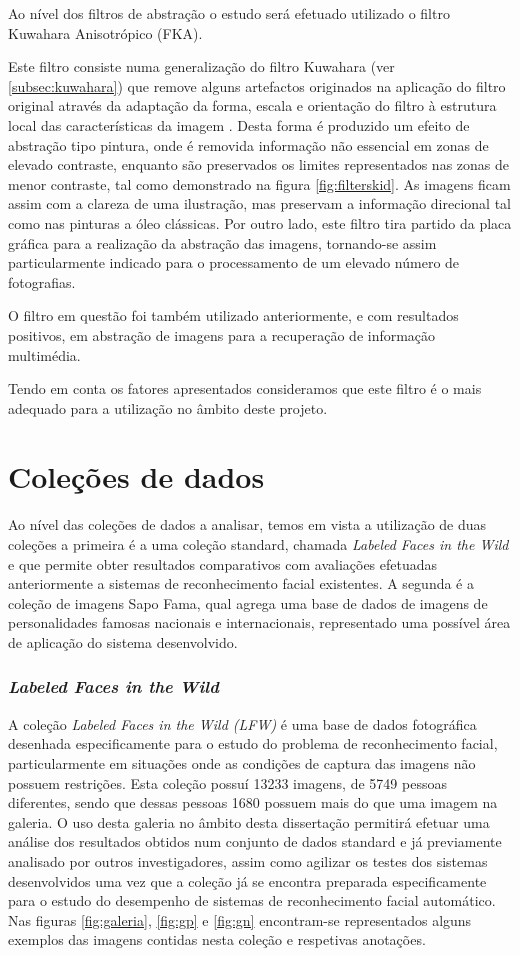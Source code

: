 Ao nível dos filtros de abstração o estudo será efetuado utilizado o filtro Kuwahara Anisotrópico (FKA).

Este filtro consiste numa generalização do filtro Kuwahara (ver \ref{subsec:kuwahara}) que remove alguns artefactos originados na aplicação do filtro original através da adaptação da forma, escala e orientação do filtro à estrutura local das características da imagem \cite{Kyprianidis2009}. Desta forma é produzido um efeito de abstração tipo pintura, onde é removida informação não essencial em zonas de elevado contraste, enquanto são preservados os limites representados nas zonas de menor contraste, tal como demonstrado na figura \ref{fig:filterskid}. As imagens ficam assim com a clareza de uma ilustração, mas preservam a informação direcional tal como nas pinturas a óleo clássicas. Por outro lado, este filtro tira partido da placa gráfica para a realização da abstração das imagens, tornando-se assim particularmente indicado para o processamento de um elevado número de fotografias.

O filtro em questão foi também utilizado anteriormente, e com resultados positivos, em abstração de imagens para a recuperação de informação multimédia. 

Tendo em conta os fatores apresentados consideramos que este filtro é o mais adequado para a utilização no âmbito deste projeto.

\section{Coleções de dados}
Ao nível das coleções de dados a analisar, temos em vista a utilização de duas coleções a primeira é a uma coleção standard, chamada \textit{Labeled Faces in the Wild} e que permite obter resultados comparativos com avaliações efetuadas anteriormente a sistemas de reconhecimento facial existentes. A segunda é a coleção de imagens Sapo Fama, qual agrega uma base de dados de imagens de personalidades famosas nacionais e internacionais, representado uma possível área de aplicação do sistema desenvolvido.

\subsubsection{\textit{Labeled Faces in the Wild}}
A coleção \textit{Labeled Faces in the Wild (LFW)} é uma base de dados fotográfica desenhada especificamente para o estudo do problema de reconhecimento facial, particularmente em situações onde as condições de captura das imagens não possuem restrições. Esta coleção possuí 13233 imagens, de 5749 pessoas diferentes, sendo que dessas pessoas 1680 possuem mais do que uma imagem na galeria. O uso desta galeria no âmbito desta dissertação permitirá efetuar uma análise dos resultados obtidos num conjunto de dados standard e já previamente analisado por outros investigadores, assim como agilizar os testes dos sistemas desenvolvidos uma vez que a coleção já se encontra preparada especificamente para o estudo do desempenho de sistemas de reconhecimento facial automático. Nas figuras \ref{fig:galeria}, \ref{fig:gp} e \ref{fig:gn} encontram-se representados alguns exemplos das imagens contidas nesta coleção e respetivas anotações.

